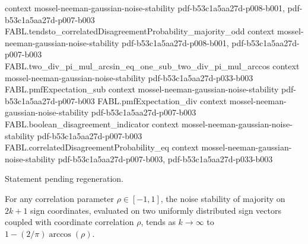 \begin{theorem}
  {context}
  {mossel-neeman-gaussian-noise-stability}
  {pdf-b53c1a5aa27d-p008-b001,
    pdf-b53c1a5aa27d-p007-b003}
\proofstep
  {FABL.tendsto_correlatedDisagreementProbability_majority_odd}
  {context}
  {mossel-neeman-gaussian-noise-stability}
  {pdf-b53c1a5aa27d-p008-b001,
    pdf-b53c1a5aa27d-p007-b003}
\proofstep
  {FABL.two_div_pi_mul_arcsin_eq_one_sub_two_div_pi_mul_arccos}
  {context}
  {mossel-neeman-gaussian-noise-stability}
  {pdf-b53c1a5aa27d-p033-b003}
\proofstep
  {FABL.pmfExpectation_sub}
  {context}
  {mossel-neeman-gaussian-noise-stability}
  {pdf-b53c1a5aa27d-p007-b003}
\proofstep
  {FABL.pmfExpectation_div}
  {context}
  {mossel-neeman-gaussian-noise-stability}
  {pdf-b53c1a5aa27d-p007-b003}
\proofstep
  {FABL.boolean_disagreement_indicator}
  {context}
  {mossel-neeman-gaussian-noise-stability}
  {pdf-b53c1a5aa27d-p007-b003}
\proofstep
  {FABL.correlatedDisagreementProbability_eq}
  {context}
  {mossel-neeman-gaussian-noise-stability}
  {pdf-b53c1a5aa27d-p007-b003,
    pdf-b53c1a5aa27d-p033-b003}

Statement pending regeneration.
\end{theorem}

\begin{theorem}
\label{FABL.tendsto_noiseStability_majority_odd_arccos}
\leanok
{}
For any correlation parameter $\rho\in[-1,1]$, the noise stability of majority on $2k+1$
sign coordinates, evaluated on two uniformly distributed sign vectors coupled with
coordinate correlation $\rho$, tends as $k\to\infty$ to $1-(2/\pi)\arccos(\rho)$.
\end{theorem}


